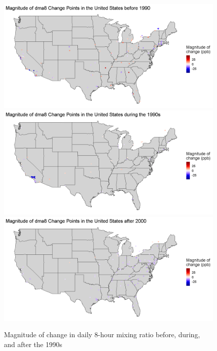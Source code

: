 \documentclass[11pt, oneside]{article}
\theoremstyle{definition}
\begin{document}
\begin{figure}[H]
    \centering
    \includegraphics[width=0.8\linewidth]{plots/clustering/changes_before_1990.png}
    \includegraphics[width=0.8\linewidth]{plots/clustering/changes_during_1990s.png}
    \includegraphics[width=0.8\linewidth]{plots/clustering/changes_after_2000.png}
    \caption{Magnitude of change in daily 8-hour mixing ratio before, during, and after the 1990s}
    \label{na_dma8_changes}
\end{figure}


\end{document}

